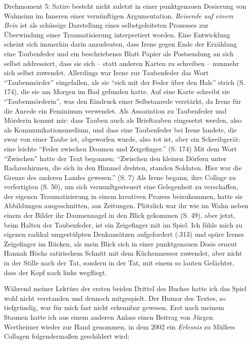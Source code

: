 \documentclass[fontsize=12pt]{scrartcl}
\begin{document}
Drehmoment 5: Satire be\-steht nicht zu\-letzt in einer punktgenauen Dosierung von Wahnsinn im Inneren einer vern\"unftigen Argumentation. \textit{Reisende auf einem Bein} ist als sch\"ussige Darstellung eines \mbox{selbst}geleiteten Prozesses zur \"Uberwindung ei\-ner Traumatisierung interpretiert worden. Eine Entwicklung scheint sich immerhin darin anzudeuten, dass Irene gegen Ende der Erz\"ahlung eine Taubenfeder und ein beschriebenes Blatt Papier als Postsendung an sich \mbox{selbst} addressiert, dass sie sich -- statt anderen Karten zu schrei\-ben -- nunmehr sich \mbox{selbst} zuwendet. Al\-ler\-dings war Irene zur Taubenfeder das Wort "`Taubenm\"order"' eingefallen, als sie "`sich mit der Feder \"uber den Hals"' strich (S. 174), die sie am Morgen im Bad gefunden hatte. Auf eine Karte schreibt sie "`Taubenm\"orderin"', was den Eindruck ei\-ner Selbst\-\-an\-rede verst\"arkt, da Irene f\"ur die Anrede ein Femininum verwendet. Als Assoziation zu Taubenfeder und M\"orderin kommt mir: dass Tauben auch als Brieftauben eingesetzt werden, also als Kommunikationsmedium, und dass eine Taubenfeder bei Irene landete, die zwar von einer Taube ist, abgeworfen wurde, also tot ist, aber ein Schreibger\"at: eine leichte "`Feder zwischen Daumen und Zeigefinger."' (S. 174) Mit dem Wort "`Zwischen"' hatte der Text begonnen: "`Zwischen den kleinen D\"orfern unter Radarschirmen, die sich in den Himmel drehten, standen Soldaten. \mbox{Hier} war die Grenze des anderen Landes gewesen."' (S. 7) Als Irene begann, ihre Collage zu verfertigten (S. 50), um sich vernunftgesteuert eine Gelegenheit zu verschaffen, der eigenen Traumatisierung in einem kreativen Prozess beizukommen, hatte sie Abbildungen ausgeschnitten, aus Zeitungen. Pl\"otzlich war ihr wie im Wahn neben einem der Bilder ihr Daumennagel in den Blick gekommen (S. 49), aber jetzt, beim Halten der Taubenfeder, ist ein Zeigefinger mit im Spiel. Ich f\"uhle mich zu eigenen radikal umgest\"ulpten Denk\-ans\"at\-zen aufgefordert (\cite{Renneke2008}:313) und sp\"ure Irenes Zeigefinger im R\"ucken, als mein Blick sich in einer punktgenauen Dosis erneut Hannah H\"ochs satirischem Schnitt mit dem K\"uchenmesser zuwendet, aber nicht in der Stille nach der Tat, sondern in der Tat, mit einem so lauten Gel\"achter, dass der Kopf nach links wegfliegt.

W\"ahrend meiner Lekt\"ure der ersten beiden Drittel des Buches hatte ich das Spiel wohl nicht verstanden und dennoch mitgespielt. Der Humor des Textes, so tiefgr\"undig, war f\"ur mich fast nicht erkennbar gewesen. Erst nach meinem Staunen hatte ich aus einem anderen Anlass einen Beitrag von J\"urgen Wertheimer wieder zur Hand genommen, in dem 2002 ein \textit{Erlesnis} zu M\"ullers Collagen folgenderma{\ss}en geschildert wird: 
\end{document}
